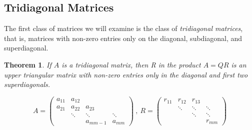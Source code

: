 \documentclass{article}
\numberwithin{pic}{section}
\numberwithin{lem}{section}
\newtheorem{thm}{Theorem}
\numberwithin{thm}{section}
\numberwithin{cor}{section}
\theoremstyle{definition}
\numberwithin{ex}{section}
\numberwithin{defn}{section}
\theoremstyle{definition}
\theoremstyle{remark}
\begin{document}
\subsection{Tridiagonal Matrices}
The first class of matrices we will examine is the class of \textit{tridiagonal
  matrices}, that is, matrices with non-zero entries only on the diagonal,
subdiagonal, and superdiagonal. 
\begin{thm}
If $A$ is a tridiagonal matrix, then R in the product $A=QR$ is an upper triangular matrix with non-zero entries only in the diagonal and first two superdiagonals.
\end{thm}
\[A=\begin{pmatrix}
a_{11} & a_{12} &  &   \\ 
a_{21} & a_{22} & a_{23} &    \\ 
 & \ddots & \ddots & \ddots   \\ 
   &  & a_{m m-1} & a_{mm}
\end{pmatrix}~,~R=\begin{pmatrix}
r_{11} & r_{12} & r_{13} &  \\ 
 & \ddots & \ddots & \ddots \\ 
 &  & \ddots & \ddots \\ 
 &  &  & r_{mm}
\end{pmatrix}  \]
\end{document}

